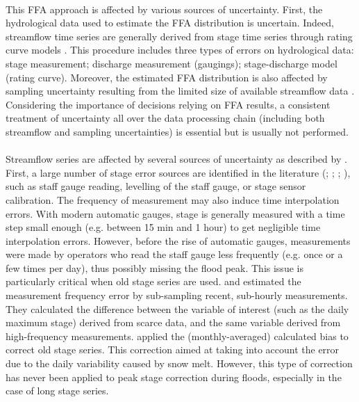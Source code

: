     \paragraph{}
    This FFA approach is affected by various sources of uncertainty. First, the hydrological data used to estimate the FFA distribution is uncertain. Indeed, streamflow time series are generally derived from stage time series through rating curve models \citep{rantz_measurement_1982}. This procedure includes three types of errors on hydrological data: stage measurement; discharge measurement (gaugings); stage-discharge model (rating curve). Moreover, the estimated FFA distribution is also affected by sampling uncertainty resulting from the limited size of available streamflow data \citep{kjeldsen_uncertainty_2011}. Considering the importance of decisions relying on FFA results, a consistent treatment of uncertainty all over the data processing chain (including both streamflow and sampling uncertainties) is essential but is usually not performed.
    
    \paragraph{}
    Streamflow series are affected by several sources of uncertainty as described by \citet{mcmillan_benchmarking_2012}. First, a large number of stage error sources are identified in the literature (\citet{van_der_made_determination_1982}; \citet{petersen-overleir_uncertainty_2005}; \citet{mcmillan_benchmarking_2012}; \citet{horner_impact_2018}), such as staff gauge reading, levelling of the staff gauge, or stage sensor calibration. The frequency of measurement may also induce time interpolation errors. With modern automatic gauges, stage is generally measured with a time step small enough (e.g. between 15 min and 1 hour) to get negligible time interpolation errors. However, before the rise of automatic gauges, measurements were made by operators who read the staff gauge less frequently (e.g. once or a few times per day), thus possibly missing the flood peak. This issue is particularly critical when old stage series are used. \citet{hamilton_quantifying_2012} and \citet{kuentz_hydrometrie_2014} estimated the measurement frequency error by sub-sampling recent, sub-hourly measurements. They calculated the difference between the variable of interest (such as the daily maximum stage) derived from scarce data, and the same variable derived from high-frequency measurements. \citet{kuentz_hydrometrie_2014} applied the (monthly-averaged) calculated bias to correct old stage series. This correction aimed at taking into account the error due to the daily variability caused by snow melt. However, this type of correction has never been applied to peak stage correction during floods, especially in the case of long stage series.
    
